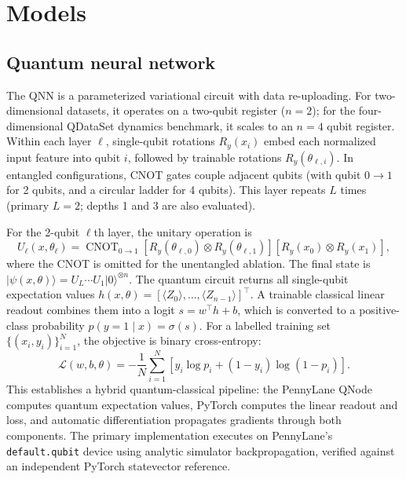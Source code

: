 \section{Models}
\subsection{Quantum neural network}
The QNN is a parameterized variational circuit with data re-uploading. For two-dimensional datasets, it operates on a two-qubit register ($n=2$); for the four-dimensional QDataSet dynamics benchmark, it scales to an $n=4$ qubit register. Within each layer $\ell$, single-qubit rotations $R_y(x_i)$ embed each normalized input feature into qubit $i$, followed by trainable rotations $R_y(\theta_{\ell,i})$. In entangled configurations, CNOT gates couple adjacent qubits (with qubit $0\to1$ for 2 qubits, and a circular ladder for 4 qubits). This layer repeats $L$ times (primary $L=2$; depths 1 and 3 are also evaluated).

For the 2-qubit $\ell$th layer, the unitary operation is
\begin{equation}
U_\ell(x,\theta_\ell)=\operatorname{CNOT}_{0\rightarrow1}
\left[R_y(\theta_{\ell,0})\otimes R_y(\theta_{\ell,1})\right]
\left[R_y(x_0)\otimes R_y(x_1)\right],
\end{equation}
where the CNOT is omitted for the unentangled ablation. The final state is $|\psi(x,\theta)\rangle=U_L\cdots U_1|0\rangle^{\otimes n}$. The quantum circuit returns all single-qubit expectation values $h(x,\theta)=[\langle Z_0\rangle,\dots,\langle Z_{n-1}\rangle]^\top$. A trainable classical linear readout combines them into a logit $s=w^\top h+b$, which is converted to a positive-class probability $p(y=1\mid x)=\sigma(s)$. For a labelled training set $\{(x_i,y_i)\}_{i=1}^N$, the objective is binary cross-entropy:
\begin{equation}
  \mathcal{L}(w,b,\theta)=-\frac{1}{N}\sum_{i=1}^{N}\left[y_i\log p_i+(1-y_i)\log(1-p_i)\right].
\end{equation}
This establishes a hybrid quantum-classical pipeline: the PennyLane QNode computes quantum expectation values, PyTorch computes the linear readout and loss, and automatic differentiation propagates gradients through both components. The primary implementation executes on PennyLane's \texttt{default.qubit} device using analytic simulator backpropagation, verified against an independent PyTorch statevector reference.

